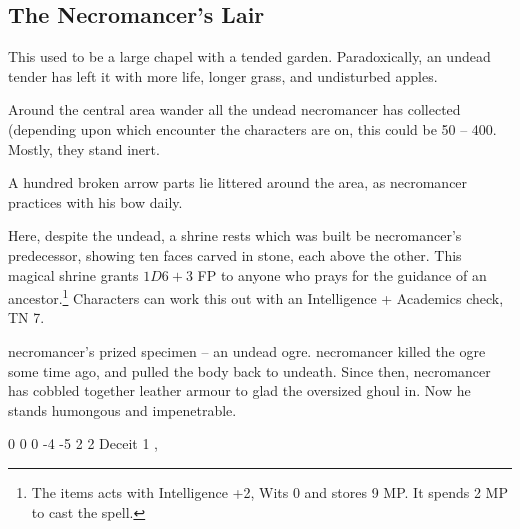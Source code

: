 \begin{multicols}{2}

\setcounter{list}{0}

\subsection{The Necromancer's Lair}\label{necromancers_lair}
This used to be a large chapel with a tended garden.  Paradoxically, an undead tender has left it with more life, longer grass, and undisturbed apples.

\begin{figure*}[t]



\end{figure*}


Around the central area wander all the undead \gls{necromancer} has collected (depending upon which encounter the characters are on, this could be 50 -- 400.  Mostly, they stand inert.

A hundred broken arrow parts lie littered around the area, as \gls{necromancer} practices with his bow daily.



Here, despite the undead, a shrine rests which was built be \gls{necromancer}'s predecessor, showing ten faces carved in stone, each above the other.  This magical shrine grants $1D6 + 3$ FP to anyone who prays for the guidance of an ancestor.\footnote{The items acts with Intelligence +2, Wits 0 and stores 9 MP. It spends 2 MP to cast the spell.}  Characters can work this out with an Intelligence + Academics check, TN 7.


\Gls{necromancer}'s prized specimen -- an undead ogre.
\Gls{necromancer} killed the ogre some time ago, and pulled the body back to undeath.
Since then, \gls{necromancer} has cobbled together leather armour to glad the oversized ghoul in.
Now he stands humongous and impenetrable.


{0}%
{0}%
{{0}%
{-4}%
{-5}}%
{2}%
{2}%
{Deceit 1}%
{\greatclub, \completeleather}%
{}%



\end{multicols}
